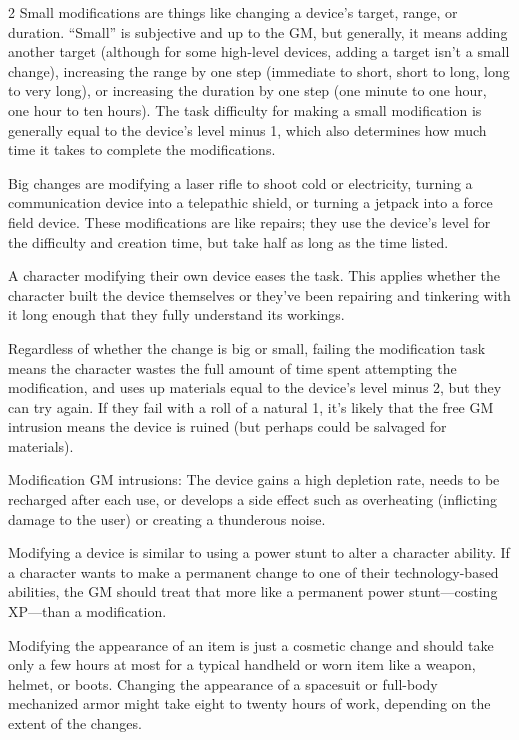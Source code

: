 \begin{multicols}{2}
Small modifications are things like changing a device’s target, range, or duration. “Small” is subjective and up to the GM, but generally, it means adding another target (although for some high-level devices, adding a target isn’t a small change), increasing the range by one step (immediate to short, short to long, long to very long), or increasing the duration by one step (one minute to one hour, one hour to ten hours). The task difficulty for making a small modification is generally equal to the device’s level minus 1, which also determines how much time it takes to complete the modifications. 

Big changes are modifying a laser rifle to shoot cold or electricity, turning a communication device into a telepathic shield, or turning a jetpack into a force field device. These modifications are like repairs; they use the device’s level for the difficulty and creation time, but take half as long as the time listed. 

A character modifying their own device eases the task. This applies whether the character built the device themselves or they’ve been repairing and tinkering with it long enough that they fully understand its workings.

Regardless of whether the change is big or small, failing the modification task means the character wastes the full amount of time spent attempting the modification, and uses up materials equal to the device’s level minus 2, but they can try again. If they fail with a roll of a natural 1, it’s likely that the free GM intrusion means the device is ruined (but perhaps could be salvaged for materials).

Modification GM intrusions: The device gains a high depletion rate, needs to be recharged after each use, or develops a side effect such as overheating (inflicting damage to the user) or creating a thunderous noise.

Modifying a device is similar to using a power stunt to alter a character ability. If a character wants to make a permanent change to one of their technology-based abilities, the GM should treat that more like a permanent power stunt—costing XP—than a modification.

Modifying the appearance of an item is just a cosmetic change and should take only a few hours at most for a typical handheld or worn item like a weapon, helmet, or boots. Changing the appearance of a spacesuit or full-body mechanized armor might take eight to twenty hours of work, depending on the extent of the changes.


\end{multicols}
